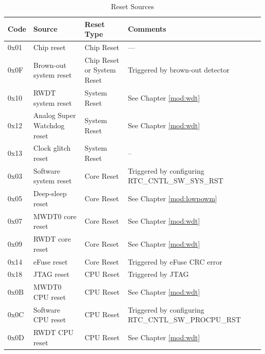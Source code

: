 \documentclass[main\_\_EN.tex]{subfiles}
\begin{document}
\begin{table}[H]
    \centering
    \caption{Reset Sources}
    \label{tab:resclk-reset-src}
    \begin{threeparttable}
    \begin{tabular}{ |l|m{3.5cm}|m{1.8cm}|m{9.2cm}| }
    \hline
\rowcolor{lightgray}
        \textbf{Code} & \textbf{Source} & \textbf{Reset Type} &   \textbf{Comments} \\\hline
        0x01 & Chip reset\tnote{1} & Chip Reset &  --- \\
        \hline
        0x0F & Brown-out system reset & Chip Reset or System Reset & Triggered by brown-out detector\tnote{2}\\
        \hline
        0x10 & RWDT system reset & System Reset & See Chapter \ref{mod:wdt} \textit{\nameref{mod:wdt}}
        \\\hline
        0x12 & Analog Super Watchdog reset & System Reset & See Chapter \ref{mod:wdt} \textit{\nameref{mod:wdt}}
        \\\hline
        0x13 & Clock glitch reset & System Reset & –
        \\\hline
        0x03 & Software system reset & Core Reset & Triggered by configuring RTC\_CNTL\_SW\_SYS\_RST \\
        \hline
        0x05 & Deep-sleep reset & Core Reset & See Chapter \ref{mod:lowpowm} \textit{\nameref{mod:lowpowm}}
        \\\hline
        0x07 & MWDT0 core reset & Core Reset & See Chapter \ref{mod:wdt} \textit{\nameref{mod:wdt}}
        \\\hline
        0x09 & RWDT core reset & Core Reset & See Chapter \ref{mod:wdt} \textit{\nameref{mod:wdt}}
        \\\hline
        0x14 & eFuse reset & Core Reset & Triggered by eFuse CRC error
        \\\hline
        0x18 & JTAG reset & CPU Reset & Triggered by JTAG\\\hline
        0x0B & MWDT0 CPU reset & CPU Reset & See Chapter \ref{mod:wdt} \textit{\nameref{mod:wdt}}
        \\\hline
         0x0C & Software CPU reset & CPU Reset & Triggered by configuring RTC\_CNTL\_SW\_PROCPU\_RST \\
        \hline
        0x0D & RWDT CPU reset & CPU Reset & See Chapter \ref{mod:wdt} \textit{\nameref{mod:wdt}}
        \\\hline
\end{tabular}


\end{threeparttable}
\end{table}
\end{document}
